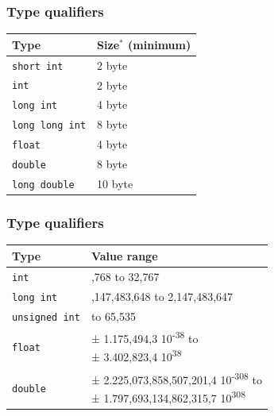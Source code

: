 \documentclass[14pt,a4paper,dvipsnames,usenames]{beamer}
\begin{document}
\begin{frame}[fragile]
  \frametitle{Type qualifiers}

  \footnotesize
  \vspace*{-1em}
  \begin{center}
    {\renewcommand{\arraystretch}{1.4}
    \begin{tabular}{|L{5cm}|L{3cm}|}\hline
      {\color{Tropiteal}Type} & {\color{Tropiteal}Size$^*$ \fontsize{8pt}{8pt}\selectfont (minimum)} \\ \hline
      \lstinline!short int! & 2 byte \\
      \lstinline!int! & 2 byte \\
      \lstinline!long int! & 4 byte \\
      \lstinline!long long int! & 8 byte \\ \hline
      \lstinline!float! & 4 byte \\
      \lstinline!double! & 8 byte \\
      \lstinline!long double! & 10 byte \\ \hline
    \end{tabular}
    }
  \end{center}

  \nointerlineskip

\end{frame}

\begin{frame}[fragile]
  \frametitle{Type qualifiers}

  \vspace*{-.5em}
  \footnotesize
  \begin{center}
    {\renewcommand{\arraystretch}{1.4}
    \begin{tabular}{|l|L{7.5cm}|}\hline
      {\color{Tropiteal}Type} & {\color{Tropiteal}Value range} \\ \hline
      \lstinline!int! & {,768 to 32,767} \\
      \lstinline!long int! & {,147,483,648 to 2,147,483,647} \\
      \lstinline!unsigned int! & { to 65,535}  \\ \hline
      \lstinline!float! & {\ttfamily ± 1.175,494,3 10\textsuperscript{-38} to\newline
        ± 3.402,823,4 10\textsuperscript{38} }\\
      \lstinline!double! & {\ttfamily ± 2.225,073,858,507,201,4 10\textsuperscript{-308} to\newline
        ± 1.797,693,134,862,315,7 10\textsuperscript{308} }\\ \hline
    \end{tabular}
    }
  \end{center}

\end{frame}
\end{document}

